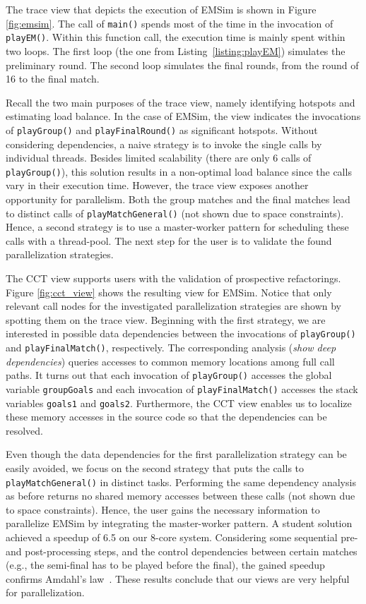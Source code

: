 The trace view that depicts the execution of EMSim is shown in Figure
\ref{fig:emsim}. The call of \texttt{main()} spends most of the time in the
invocation of \texttt{playEM()}. Within this function call, the execution time
is mainly spent within two loops. The first loop (the one from
Listing~\ref{listing:playEM}) simulates the preliminary round. The second loop
simulates the final rounds, from the round of 16 to the final match.

Recall the two main purposes of the trace view, namely identifying hotspots
and estimating load balance. In the case of EMSim, the view indicates the
invocations of \texttt{playGroup()} and \texttt{playFinalRound()} as
significant hotspots. Without considering dependencies, a naive strategy is to
invoke the single calls by individual threads. Besides limited scalability
(there are only 6 calls of \texttt{playGroup()}), this solution results in a
non-optimal load balance since the calls vary in their execution time. However,
the trace view exposes another opportunity for parallelism. Both the group
matches and the final matches lead to distinct calls of
\texttt{playMatchGeneral()} (not shown due to space constraints). Hence, a
second strategy is to use a master-worker pattern for scheduling these calls
with a thread-pool. The next step for the user is to validate the found
parallelization strategies.

The CCT view supports users with the validation of prospective refactorings. 
Figure \ref{fig:cct_view} shows the resulting view for EMSim. Notice that
only relevant call nodes for the investigated parallelization strategies are
shown by spotting them on the trace view. Beginning with the first strategy, we
are interested in possible data dependencies between the invocations of
\texttt{playGroup()} and \texttt{playFinalMatch()}, respectively. The
corresponding analysis (\textit{show deep dependencies}) queries accesses 
to common memory locations among full call paths. It turns out that each
invocation of \texttt{playGroup()} accesses the global variable
\texttt{groupGoals} and each invocation of \texttt{playFinalMatch()} accesses
the stack variables \texttt{goals1} and \texttt{goals2}. Furthermore, the CCT
view enables us to localize these memory accesses in the source code so that
the dependencies can be resolved.

Even though the data dependencies for the first parallelization strategy
can be easily avoided, we focus on the second strategy that puts the calls to
\texttt{playMatchGeneral()} in distinct tasks. Performing the same dependency
analysis as before returns no shared memory accesses between these calls (not
shown due to space constraints). Hence, the user gains the necessary
information to parallelize EMSim by integrating the master-worker pattern. A
student solution achieved a speedup of 6.5 on our 8-core system. Considering
some sequential pre- and post-processing steps, and the control dependencies
between certain matches (e.g., the semi-final has to be played before the
final), the gained speedup confirms Amdahl's law~\cite{amdahl}. These results
conclude that our views are very helpful for parallelization.
